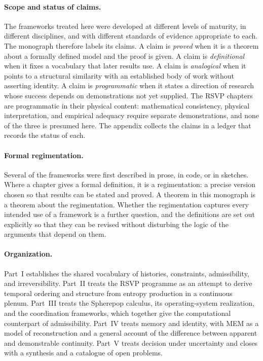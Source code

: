 \documentclass[11pt,twoside,openright]{book}
\theoremstyle{plain}
\theoremstyle{definition}
\theoremstyle{remark}
\newcommand{\memeight}{\mbox{MEM\textbar 8}}
\newcommand{\rsvp}{RSVP}
\begin{document}
\paragraph{Scope and status of claims.}
The frameworks treated here were developed at different levels of maturity, in different disciplines, and with different standards of evidence appropriate to each. The monograph therefore labels its claims. A claim is \emph{proved} when it is a theorem about a formally defined model and the proof is given. A claim is \emph{definitional} when it fixes a vocabulary that later results use. A claim is \emph{analogical} when it points to a structural similarity with an established body of work without asserting identity. A claim is \emph{programmatic} when it states a direction of research whose success depends on demonstrations not yet supplied. The \rsvp{} chapters are programmatic in their physical content: mathematical consistency, physical interpretation, and empirical adequacy require separate demonstrations, and none of the three is presumed here. The appendix collects the claims in a ledger that records the status of each.

\paragraph{Formal regimentation.}
Several of the frameworks were first described in prose, in code, or in sketches. Where a chapter gives a formal definition, it is a regimentation: a precise version chosen so that results can be stated and proved. A theorem in this monograph is a theorem about the regimentation. Whether the regimentation captures every intended use of a framework is a further question, and the definitions are set out explicitly so that they can be revised without disturbing the logic of the arguments that depend on them.

\paragraph{Organization.}
Part~I establishes the shared vocabulary of histories, constraints, admissibility, and irreversibility. Part~II treats the \rsvp{} programme as an attempt to derive temporal ordering and structure from entropy production in a continuous plenum. Part~III treats the Spherepop calculus, its operating-system realization, and the coordination frameworks, which together give the computational counterpart of admissibility. Part~IV treats memory and identity, with \memeight{} as a model of reconstruction and a general account of the difference between apparent and demonstrable continuity. Part~V treats decision under uncertainty and closes with a synthesis and a catalogue of open problems.
\end{document}
